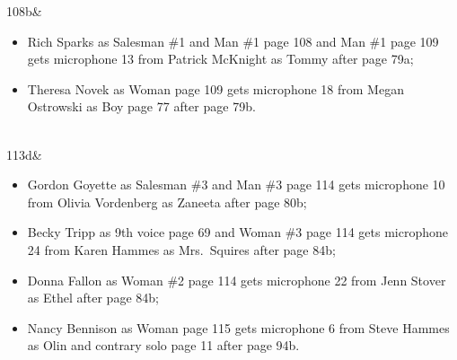 108b&\begin{itemize}
\item Rich Sparks as Salesman \#1 and Man \#1 page 108 and Man \#1 page 109 gets microphone 13 from Patrick McKnight as Tommy after page 79a;
\item Theresa Novek as Woman page 109 gets microphone 18 from Megan Ostrowski as Boy page 77 after page 79b.
\end{itemize}\\\hline
113d&\begin{itemize}
\item Gordon Goyette as Salesman \#3 and Man \#3 page 114 gets microphone 10 from Olivia Vordenberg as Zaneeta after page 80b;
\item Becky Tripp as 9th voice page 69 and Woman \#3 page 114 gets microphone 24 from Karen Hammes as Mrs.~Squires after page 84b;
\item Donna Fallon as Woman \#2 page 114 gets microphone 22 from Jenn Stover as Ethel after page 84b;
\item Nancy Bennison as Woman page 115 gets microphone 6 from Steve Hammes as Olin and contrary solo page 11 after page 94b.
\end{itemize}\\\hline
